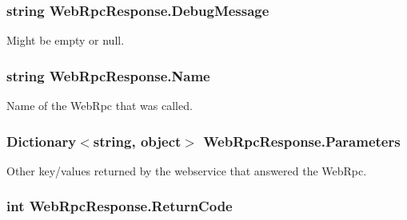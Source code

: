 \subsubsection[{\texorpdfstring{Debug\+Message}{DebugMessage}}]{\setlength{\rightskip}{0pt plus 5cm}string Web\+Rpc\+Response.\+Debug\+Message\hspace{0.3cm}{\ttfamily [get]}}\hypertarget{class_web_rpc_response_a328292c9db1a4c5559b00b9e6b7d1b69}{}\label{class_web_rpc_response_a328292c9db1a4c5559b00b9e6b7d1b69}


Might be empty or null.

\subsubsection[{\texorpdfstring{Name}{Name}}]{\setlength{\rightskip}{0pt plus 5cm}string Web\+Rpc\+Response.\+Name\hspace{0.3cm}{\ttfamily [get]}}\hypertarget{class_web_rpc_response_ab1431df146dda7dfd8c5771bf592504d}{}\label{class_web_rpc_response_ab1431df146dda7dfd8c5771bf592504d}


Name of the Web\+Rpc that was called.

\subsubsection[{\texorpdfstring{Parameters}{Parameters}}]{\setlength{\rightskip}{0pt plus 5cm}Dictionary$<$string, object$>$ Web\+Rpc\+Response.\+Parameters\hspace{0.3cm}{\ttfamily [get]}}\hypertarget{class_web_rpc_response_a7c718bc7f77fa026307ac93f99c81c92}{}\label{class_web_rpc_response_a7c718bc7f77fa026307ac93f99c81c92}


Other key/values returned by the webservice that answered the Web\+Rpc.

\subsubsection[{\texorpdfstring{Return\+Code}{ReturnCode}}]{\setlength{\rightskip}{0pt plus 5cm}int Web\+Rpc\+Response.\+Return\+Code\hspace{0.3cm}{\ttfamily [get]}}\hypertarget{class_web_rpc_response_ac0f2c0f4cf1ad20705f4bb1cff84461d}{}\label{class_web_rpc_response_ac0f2c0f4cf1ad20705f4bb1cff84461d}



